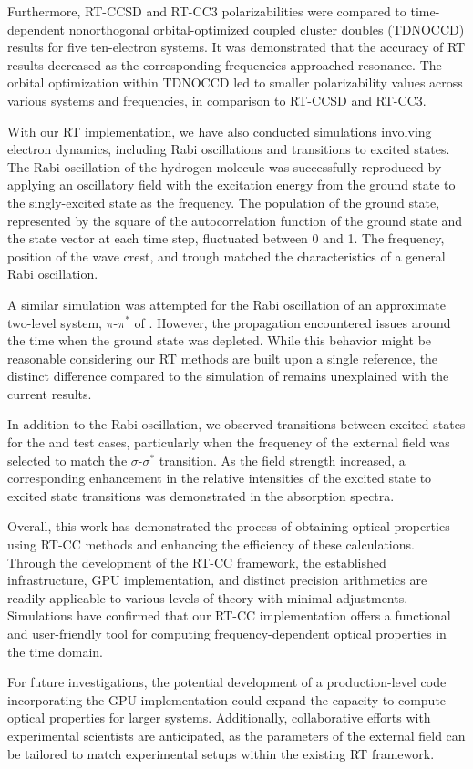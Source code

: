 Furthermore, RT-CCSD and RT-CC3 polarizabilities were compared to time-dependent nonorthogonal orbital-optimized coupled cluster doubles (TDNOCCD) results for five ten-electron systems. It was demonstrated that the accuracy of RT results decreased as the corresponding frequencies approached resonance. The orbital optimization within TDNOCCD led to smaller polarizability values across various systems and frequencies, in comparison to RT-CCSD and RT-CC3.

With our RT implementation, we have also conducted simulations involving electron dynamics, including Rabi oscillations and transitions to excited states. The Rabi oscillation of the hydrogen molecule was successfully reproduced by applying an oscillatory field with the excitation energy from the ground state to the singly-excited state as the frequency. The population of the ground state, represented by the square of the autocorrelation function of the ground state and the state vector at each time step, fluctuated between 0 and 1. The frequency, position of the wave crest, and trough matched the characteristics of a general Rabi oscillation.

A similar simulation was attempted for the Rabi oscillation of an approximate two-level system, $\pi$-$\pi^{*}$ of . However, the propagation encountered issues around the time when the ground state was depleted. While this behavior might be reasonable considering our RT methods are built upon a single reference, the distinct difference compared to the simulation of  remains unexplained with the current results.

In addition to the Rabi oscillation, we observed transitions between excited states for the  and  test cases, particularly when the frequency of the external field was selected to match the $\sigma$-$\sigma^{*}$ transition. As the field strength increased, a corresponding enhancement in the relative intensities of the excited state to excited state transitions was demonstrated in the absorption spectra.

Overall, this work has demonstrated the process of obtaining optical properties using RT-CC methods and enhancing the efficiency of these calculations. Through the development of the RT-CC framework, the established infrastructure, GPU implementation, and distinct precision arithmetics are readily applicable to various levels of theory with minimal adjustments. Simulations have confirmed that our RT-CC implementation offers a functional and user-friendly tool for computing frequency-dependent optical properties in the time domain.

For future investigations, the potential development of a production-level code incorporating the GPU implementation could expand the capacity to compute optical properties for larger systems. Additionally, collaborative efforts with experimental scientists are anticipated, as the parameters of the external field can be tailored to match experimental setups within the existing RT framework.